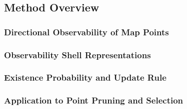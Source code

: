 \subsection{Method Overview}

\subsubsection{Directional Observability of Map Points}


\subsubsection{Observability Shell Representations}

\subsubsection{Existence Probability and Update Rule}

\subsubsection{Application to Point Pruning and Selection}
